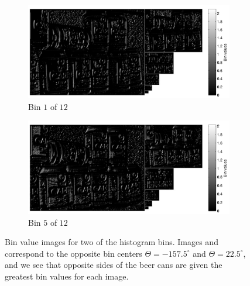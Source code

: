 \documentclass[thesis.tex]{subfiles}
\begin{document}
\begin{figure}[p]
	\centering
	\begin{subfigure}[t]{\textwidth}
		\includegraphics[width=\textwidth]{img/cellHistScaleSpacesBin01.pdf}
    	\caption{Bin $1$ of $12$}
    	\label{fig:cellHistScaleSpacesBin01}
	\end{subfigure}
	\begin{subfigure}[t]{\textwidth}
		\includegraphics[width=\textwidth]{img/cellHistScaleSpacesBin05.pdf}
    	\caption{Bin $5$ of $12$}
    	\label{fig:cellHistScaleSpacesBin05}
	\end{subfigure}
	\caption{Bin value images for two of the histogram bins. Images  and  correspond to the opposite bin centers $\Theta = -157.5^\circ$ and $\Theta = 22.5^\circ$, and we see that opposite sides of the beer cans are given the greatest bin values for each image.}
	\label{fig:cellHistScaleSpacesBins}
\end{figure}
\end{document}
